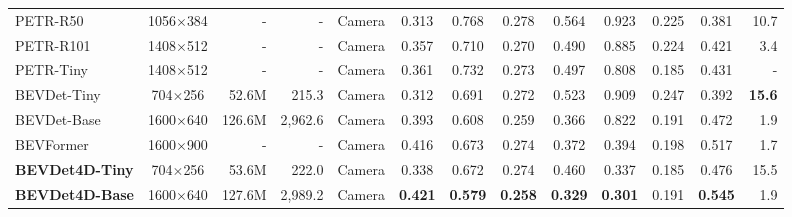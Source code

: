 \documentclass[10pt,twocolumn,letterpaper]{article}
\begin{document}
\begin{table*}[t]
{\begin{tabular}{l|crrc|cccccc|c|r}
    PETR-R50  \cite{PETR}      &1056$\times$384    &-         &-           & Camera   & 0.313         & 0.768             & 0.278              & 0.564             & 0.923             & 0.225             & 0.381           &10.7 \\
    PETR-R101 \cite{PETR}      &1408$\times$512    &-         &-           & Camera   & 0.357         & 0.710             & 0.270              & 0.490             & 0.885             & 0.224             & 0.421           &3.4 \\
    PETR-Tiny \cite{PETR}      &1408$\times$512    &-         &-           & Camera   & 0.361         & 0.732             & 0.273              & 0.497             & 0.808             & 0.185             & 0.431           &- \\
    BEVDet-Tiny\cite{BEVDet}   &704$\times$256     &52.6M      &215.3      & Camera   & 0.312         & 0.691             & 0.272              & 0.523             & 0.909             & 0.247             & 0.392           &\textbf{15.6}\\
    BEVDet-Base\cite{BEVDet}   &1600$\times$640    &126.6M     &2,962.6    & Camera   & 0.393         & 0.608             & 0.259              & 0.366             & 0.822             & 0.191             & 0.472           &1.9\\
    BEVFormer \cite{BEVFormer} &1600$\times$900   &-          &-          & Camera   & 0.416         & 0.673             & 0.274              & 0.372             & 0.394             & 0.198             & 0.517           &1.7\\
    \textbf{BEVDet4D-Tiny}     &704$\times$256     &53.6M      &222.0      & Camera   & 0.338         & 0.672             & 0.274              & 0.460             & 0.337             & 0.185             & 0.476           &15.5\\
    \textbf{BEVDet4D-Base}     &1600$\times$640    &127.6M     &2,989.2    & Camera   & \textbf{0.421}& \textbf{0.579}    & \textbf{0.258}     & \textbf{0.329}    & \textbf{0.301}    & 0.191             & \textbf{0.545}  &1.9\\


\end{tabular}}
\end{table*}
\end{document}

